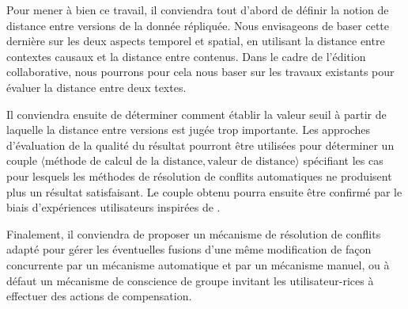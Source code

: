 Pour mener à bien ce travail, il conviendra tout d'abord de définir la notion de distance entre versions de la donnée répliquée.
Nous envisageons de baser cette dernière sur les deux aspects temporel et spatial, \ie en utilisant la distance entre contextes causaux et la distance entre contenus.
Dans le cadre de l'édition collaborative, nous pourrons pour cela nous baser sur les travaux existants pour évaluer la distance entre deux textes.

Il conviendra ensuite de déterminer comment établir la valeur seuil à partir de laquelle la distance entre versions est jugée trop importante.
Les approches d'évaluation de la qualité du résultat pourront être utilisées pour déterminer un couple $\langle \text{méthode de calcul de la distance}, \text{valeur de distance} \rangle$ spécifiant les cas pour lesquels les méthodes de résolution de conflits automatiques ne produisent plus un résultat satisfaisant.
Le couple obtenu pourra ensuite être confirmé par le biais d'expériences utilisateurs inspirées de \cite{2014-effect-delay-collaborative-editing-ignat,2015-cope-delay-collaborative-note-taking-ignat}.

Finalement, il conviendra de proposer un mécanisme de résolution de conflits adapté pour gérer les éventuelles fusions d'une même modification de façon concurrente par un mécanisme automatique et par un mécanisme manuel, ou à défaut un mécanisme de conscience de groupe invitant les utilisateur-rices à effectuer des actions de compensation.
